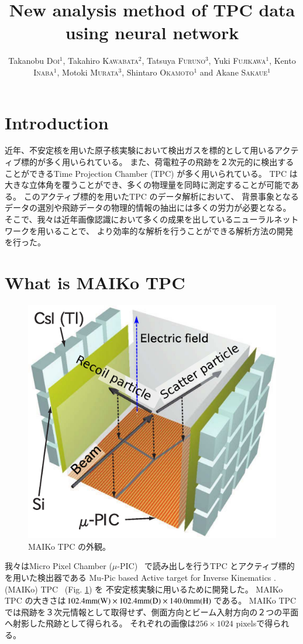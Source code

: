 \documentclass{jps-cp}
\title{New analysis method of TPC data using neural network}
\author{
  Takanobu \textsc{Doi}$^{1}$, Takahiro \textsc{Kawabata}$^{2}$, Tatsuya \textsc{Furuno}$^{3}$,
  Yuki \textsc{Fujikawa}$^{1}$, Kento \textsc{Inaba}$^{1}$, Motoki \textsc{Murata}$^{3}$,
  Shintaro \textsc{Okamoto}$^{1}$ and Akane \textsc{Sakaue}$^{1}$}
\begin{document}
\maketitle

\section{Introduction}
近年、不安定核を用いた原子核実験において検出ガスを標的として用いるアクティブ標的が多く用いられている。
また、荷電粒子の飛跡を２次元的に検出することができるTime Projection Chamber (TPC) が多く用いられている。
TPC は大きな立体角を覆うことができ、多くの物理量を同時に測定することが可能である。
このアクティブ標的を用いたTPC のデータ解析において、
背景事象となるデータの選別や飛跡データの物理的情報の抽出には多くの労力が必要となる。
そこで、我々は近年画像認識において多くの成果を出しているニューラルネットワークを用いることで、
より効率的な解析を行うことができる解析方法の開発を行った。

\section{What is MAIKo TPC}

\begin{figure}
  \begin{center}
    \includegraphics[clip, width=0.4\columnwidth]{eps/at_fig2.eps}
    \caption{MAIKo TPC の外観。}
    \label{fig:MAIKo}
  \end{center}
\end{figure}

我々はMicro Pixel Chamber ($\mu$-PIC)~\cite{mupic} で読み出しを行うTPC とアクティブ標的を用いた検出器である
Mu-Pic based Active target for Inverse Kinematics . (MAIKo) TPC~\cite{MAIKo} (Fig. \ref{fig:MAIKo}) を
不安定核実験に用いるために開発した。
MAIKo TPC の大きさは$102.4 \rm{mm} (\rm{W}) \times 102.4 \rm{mm} (\rm{D}) \times 140.0 \rm{mm} (\rm{H})$である。
MAIKo TPC では飛跡を３次元情報として取得せず、側面方向とビーム入射方向の２つの平面へ射影した飛跡として得られる。
それぞれの画像は$256\times 1024$ pixelsで得られる。
\end{document}
